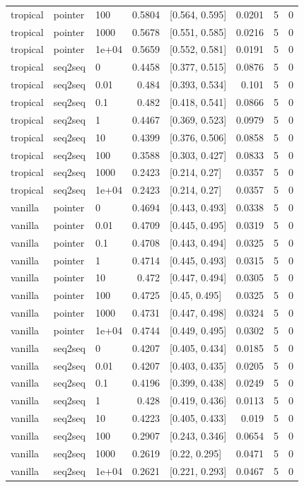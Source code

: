 \documentclass[10pt]{article}
\begin{document}
{\begin{longtable}{lllrlrrr}
tropical & pointer & 100 & 0.5804 & [0.564, 0.595] & 0.0201 & 5 & 0\\
tropical & pointer & 1000 & 0.5678 & [0.551, 0.585] & 0.0216 & 5 & 0\\
tropical & pointer & 1e+04 & 0.5659 & [0.552, 0.581] & 0.0191 & 5 & 0\\
tropical & seq2seq & 0 & 0.4458 & [0.377, 0.515] & 0.0876 & 5 & 0\\
tropical & seq2seq & 0.01 & 0.484 & [0.393, 0.534] & 0.101 & 5 & 0\\
tropical & seq2seq & 0.1 & 0.482 & [0.418, 0.541] & 0.0866 & 5 & 0\\
tropical & seq2seq & 1 & 0.4467 & [0.369, 0.523] & 0.0979 & 5 & 0\\
tropical & seq2seq & 10 & 0.4399 & [0.376, 0.506] & 0.0858 & 5 & 0\\
tropical & seq2seq & 100 & 0.3588 & [0.303, 0.427] & 0.0833 & 5 & 0\\
tropical & seq2seq & 1000 & 0.2423 & [0.214, 0.27] & 0.0357 & 5 & 0\\
tropical & seq2seq & 1e+04 & 0.2423 & [0.214, 0.27] & 0.0357 & 5 & 0\\
vanilla & pointer & 0 & 0.4694 & [0.443, 0.493] & 0.0338 & 5 & 0\\
vanilla & pointer & 0.01 & 0.4709 & [0.445, 0.495] & 0.0319 & 5 & 0\\
vanilla & pointer & 0.1 & 0.4708 & [0.443, 0.494] & 0.0325 & 5 & 0\\
vanilla & pointer & 1 & 0.4714 & [0.445, 0.493] & 0.0315 & 5 & 0\\
vanilla & pointer & 10 & 0.472 & [0.447, 0.494] & 0.0305 & 5 & 0\\
vanilla & pointer & 100 & 0.4725 & [0.45, 0.495] & 0.0325 & 5 & 0\\
vanilla & pointer & 1000 & 0.4731 & [0.447, 0.498] & 0.0324 & 5 & 0\\
vanilla & pointer & 1e+04 & 0.4744 & [0.449, 0.495] & 0.0302 & 5 & 0\\
vanilla & seq2seq & 0 & 0.4207 & [0.405, 0.434] & 0.0185 & 5 & 0\\
vanilla & seq2seq & 0.01 & 0.4207 & [0.403, 0.435] & 0.0205 & 5 & 0\\
vanilla & seq2seq & 0.1 & 0.4196 & [0.399, 0.438] & 0.0249 & 5 & 0\\
vanilla & seq2seq & 1 & 0.428 & [0.419, 0.436] & 0.0113 & 5 & 0\\
vanilla & seq2seq & 10 & 0.4223 & [0.405, 0.433] & 0.019 & 5 & 0\\
vanilla & seq2seq & 100 & 0.2907 & [0.243, 0.346] & 0.0654 & 5 & 0\\
vanilla & seq2seq & 1000 & 0.2619 & [0.22, 0.295] & 0.0471 & 5 & 0\\
vanilla & seq2seq & 1e+04 & 0.2621 & [0.221, 0.293] & 0.0467 & 5 & 0\\
\bottomrule
\end{longtable}
}
\end{document}
